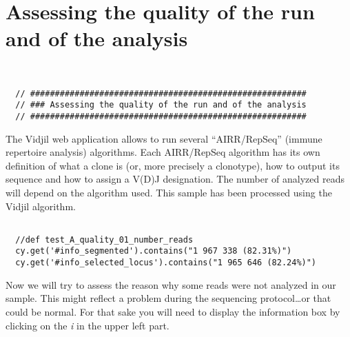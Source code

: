 
\section{Assessing the quality of the run and of the analysis}
\begin{verbatim}


  // ########################################################
  // ### Assessing the quality of the run and of the analysis
  // ########################################################

\end{verbatim}

The Vidjil web application allows to run several ``AIRR/RepSeq'' (immune repertoire analysis) algorithms.
Each AIRR/RepSeq algorithm has its own definition of what a clone is (or, more precisely
a clonotype), how to output its sequence and how to assign a V(D)J designation.
The number of analyzed reads will depend on the algorithm used.
This sample has been processed using the Vidjil algorithm.


\begin{verbatim}

  //def test_A_quality_01_number_reads
  cy.get('#info_segmented').contains("1 967 338 (82.31%)")
  cy.get('#info_selected_locus').contains("1 965 646 (82.24%)")

\end{verbatim}

Now we will try to assess the reason why some reads were not analyzed in our
sample.
This might reflect a problem during the sequencing protocol\dots or that could
be normal.
For that sake you will need to display the information box by clicking on the
\textit{i} in the upper left part.

